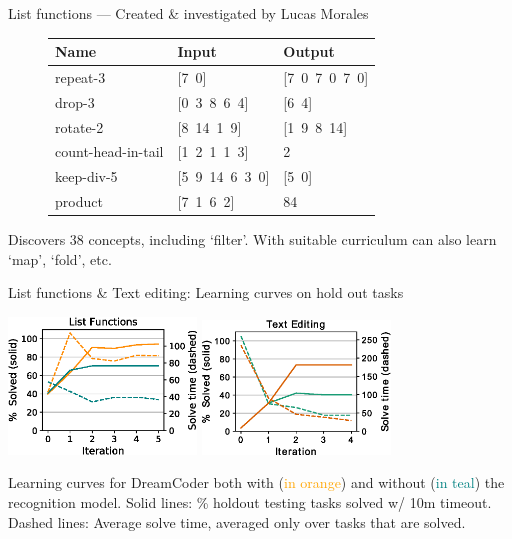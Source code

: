 \documentclass{beamer}
\newcommand{\orange}[1]{\textcolor{orange}{#1}}
\newcommand{\teal}[1]{\textcolor{teal}{#1}}
\begin{document}
\begin{frame}{List functions --- \small{Created \& investigated by Lucas
  Morales}}


  \vspace{1cm}
  
  \begin{figure}[b]\centering
\vspace{-0.5cm}  \begin{tabular}{lll}
    \toprule
    Name & Input & Output \\\midrule
    repeat-3 & [7\, 0] & [7\, 0\, 7\, 0\, 7\, 0] \\
    drop-3 & [0\, 3\, 8\, 6\, 4] & [6\, 4] \\
    rotate-2 & [8\, 14\, 1\, 9] & [1\, 9\, 8\, 14] \\
    count-head-in-tail & [1\, 2\, 1\, 1\, 3] & 2 \\
    keep-div-5 & [5\, 9\, 14\, 6\, 3\, 0] & [5\, 0] \\
    product & [7\, 1\, 6\, 2] & 84 \\
    \bottomrule
  \end{tabular}
\end{figure}

  Discovers 38 concepts, including `filter'. With suitable curriculum can also learn `map', `fold', etc.
\end{frame}

\begin{frame}{List functions \& Text editing: Learning curves on hold out tasks}

  \begin{center}
    \includegraphics[width = 5cm]{figures/listLearningCurve.eps}
\hfill    \includegraphics[width = 5cm]{figures/textLearningCurve.eps} 
    \end{center}

Learning curves for DreamCoder both with (\orange{in orange}) and without
    (\teal{in teal}) the recognition model. Solid lines: \% holdout testing tasks solved w/ 10m timeout. Dashed lines: Average solve time, averaged only over tasks that are solved.


\end{frame}
\end{document}

